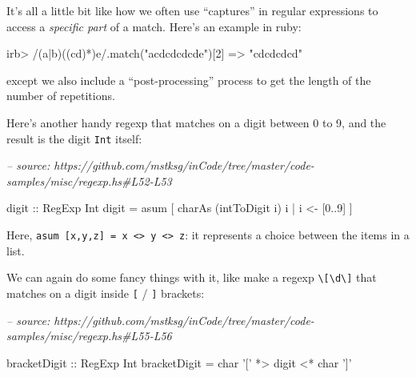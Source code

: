 \documentclass[]{article}
\newenvironment{Shaded}{}{}
\newcommand{\CharTok}[1]{\textcolor[rgb]{0.25,0.44,0.63}{#1}}
\newcommand{\CommentTok}[1]{\textcolor[rgb]{0.38,0.63,0.69}{\textit{#1}}}
\newcommand{\DataTypeTok}[1]{\textcolor[rgb]{0.56,0.13,0.00}{#1}}
\newcommand{\DecValTok}[1]{\textcolor[rgb]{0.25,0.63,0.44}{#1}}
\newcommand{\FunctionTok}[1]{\textcolor[rgb]{0.02,0.16,0.49}{#1}}
\newcommand{\NormalTok}[1]{#1}
\newcommand{\OtherTok}[1]{\textcolor[rgb]{0.00,0.44,0.13}{#1}}
\newcommand{\StringTok}[1]{\textcolor[rgb]{0.25,0.44,0.63}{#1}}
\begin{document}
It's all a little bit like how we often use ``captures'' in regular expressions
to access a \emph{specific part} of a match. Here's an example in ruby:

\begin{Shaded}
\begin{Highlighting}[]
\NormalTok{irb> }\OtherTok{/(a|b)((cd)*)e/}\NormalTok{.match(}\StringTok{"acdcdcdcde"}\NormalTok{)[}\DecValTok{2}\NormalTok{]}
\NormalTok{=> }\StringTok{"cdcdcdcd"}
\end{Highlighting}
\end{Shaded}

except we also include a ``post-processing'' process to get the length of the
number of repetitions.

Here's another handy regexp that matches on a digit between 0 to 9, and the
result is the digit \texttt{Int} itself:

\begin{Shaded}
\begin{Highlighting}[]
\CommentTok{-- source: https://github.com/mstksg/inCode/tree/master/code-samples/misc/regexp.hs#L52-L53}

\OtherTok{digit ::} \DataTypeTok{RegExp} \DataTypeTok{Int}
\NormalTok{digit }\FunctionTok{=}\NormalTok{ asum [ charAs (}\FunctionTok{intToDigit}\NormalTok{ i) i }\FunctionTok{|}\NormalTok{ i }\OtherTok{<-}\NormalTok{ [}\DecValTok{0}\FunctionTok{..}\DecValTok{9}\NormalTok{] ]}
\end{Highlighting}
\end{Shaded}

Here,
\texttt{asum\ {[}x,y,z{]}\ =\ x\ \textless{}\textbar{}\textgreater{}\ y\ \textless{}\textbar{}\textgreater{}\ z}:
it represents a choice between the items in a list.

We can again do some fancy things with it, like make a regexp
\texttt{\textbackslash{}{[}\textbackslash{}d\textbackslash{}{]}} that matches on
a digit inside \texttt{{[}} / \texttt{{]}} brackets:

\begin{Shaded}
\begin{Highlighting}[]
\CommentTok{-- source: https://github.com/mstksg/inCode/tree/master/code-samples/misc/regexp.hs#L55-L56}

\OtherTok{bracketDigit ::} \DataTypeTok{RegExp} \DataTypeTok{Int}
\NormalTok{bracketDigit }\FunctionTok{=}\NormalTok{ char }\CharTok{'['} \FunctionTok{*>}\NormalTok{ digit }\FunctionTok{<*}\NormalTok{ char }\CharTok{']'}
\end{Highlighting}
\end{Shaded}
\end{document}
